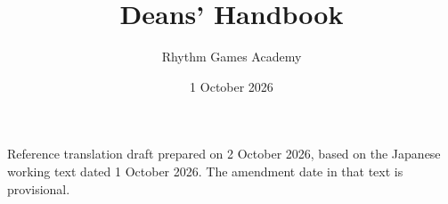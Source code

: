 \documentclass[
  report,
  fontsize   = 12pt,
  paper      = a4,
  head_space = 20mm,
  foot_space = 20mm,
  gutter     = 20mm,
  fore-edge  = 20mm
]{jlreq}
\title{Deans' Handbook}
\author{Rhythm Games Academy}
\date{1 October 2026}
\begin{document}
\maketitle
\noindent Reference translation draft prepared on 2 October 2026, based on the Japanese working text dated 1 October 2026. The amendment date in that text is provisional.
\par\medskip
\translationnotice
\newpage
\tableofcontents
\clearpage








\end{document}
